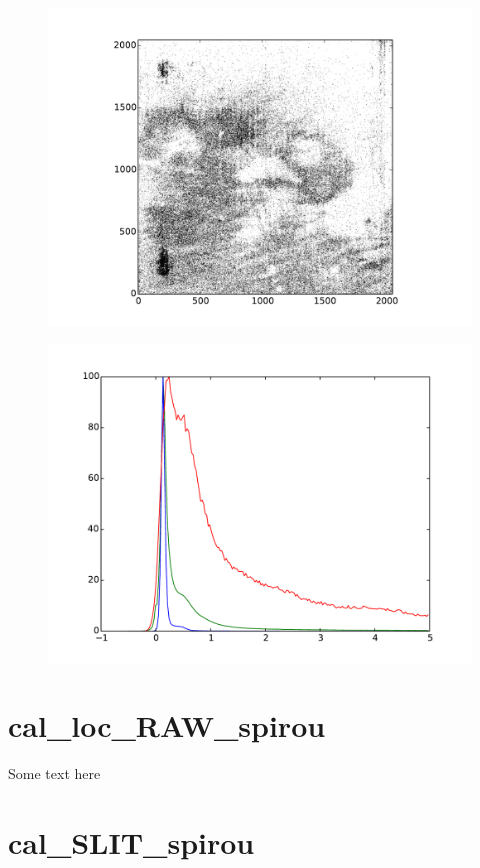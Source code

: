 \begin{figure}
\begin{center}
\includegraphics[width=.8\textwidth]{figures/cal_DARK_spirou_2.pdf}
\caption{\label{figure:cal_DARK_spirou_2}}
\end{center}
\end{figure}

\begin{figure}
\begin{center}
\includegraphics[width=.8\textwidth]{figures/cal_DARK_spirou_3.pdf}
\caption{\label{figure:cal_DARK_spirou_3}}
\end{center}
\end{figure}


\section{cal\_loc\_RAW\_spirou}
\label{section:cal_loc_RAW_spirou}

Some text here

\section{cal\_SLIT\_spirou}
\label{section:cal_SLIT_spirou}

